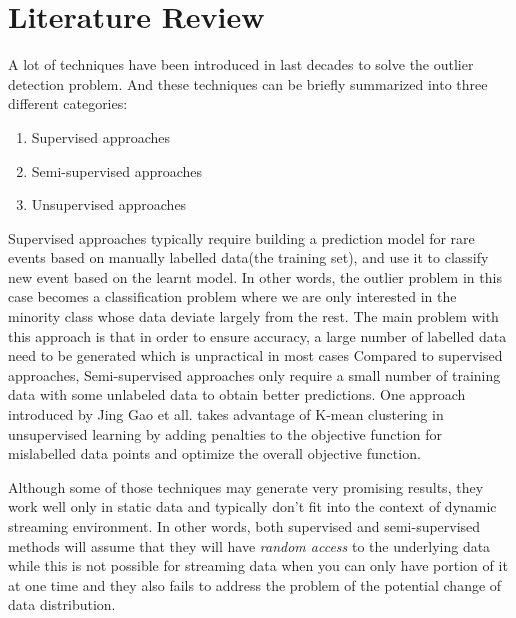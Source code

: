 \documentclass[11pt]{article}       %
\begin{document}
\section{Literature Review} \label{litrev}

A lot of techniques have been introduced in last decades to solve the outlier detection problem. And these techniques can be briefly summarized into three different categories: 

\begin{enumerate}
  \item Supervised approaches
  \item Semi-supervised approaches
  \item Unsupervised approaches
\end{enumerate}

Supervised approaches typically require building a prediction model for rare events based on manually labelled data(the training set), and use it to classify new event based on the learnt model\cite{Joshi:2001:MNH:376284.375673,sup02}. In other words, the outlier problem in this case becomes a classification problem where we are only interested in the minority class whose data deviate largely from the rest. The main problem with this approach is that in order to ensure accuracy, a large number of labelled data need to be generated which is unpractical in most cases 
Compared to supervised approaches, Semi-supervised approaches\cite{Basu:2004:PFS:1014052.1014062,semi-sup02} only require a small number of training data with some unlabeled data to obtain better predictions. One approach introduced by Jing Gao et all.\cite{Gao:2006:SOD:1141277.1141421} takes advantage of K-mean clustering in unsupervised learning by adding penalties to the objective function for mislabelled data points and optimize the overall objective function. 

Although some of those techniques may generate very promising results, they work well only in static data and typically don't fit into the context of dynamic streaming environment. In other words, both supervised and semi-supervised methods will assume that they will have \textit{random access} to the underlying data while this is not possible for streaming data when you can only have portion of it at one time and they also fails to address the problem of the potential change of data distribution.
\end{document}
